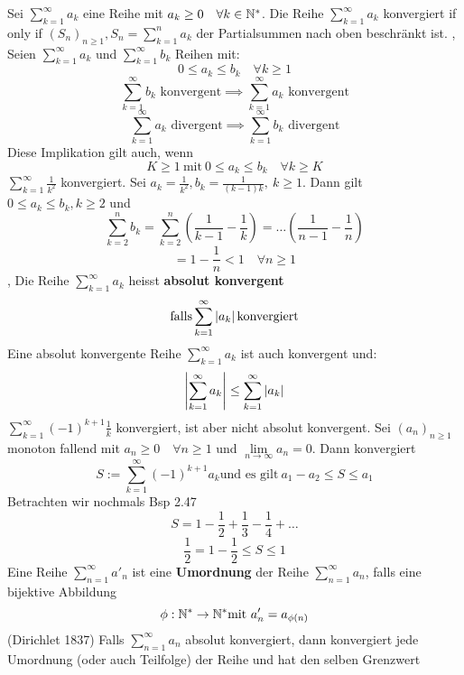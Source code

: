 \Satz[2.42] Sei \(\sum_{k=1}^{\infty} a_{k}\) eine Reihe mit \newline \(a_k \geq 0 \quad \forall k \in \mathbb{N}^*\). Die Reihe \(\sum_{k=1}^{\infty} a_{k}\) konvergiert if only if \((S_n)_{n \geq 1}, S_n = \sum_{k=1}^{n} a_{k}\) der Partialsummen nach oben beschränkt ist. \newline
\sep
{} \newline Seien $\sum_{k=1}^{\infty} a_{k}$ und $\sum_{k=1}^{\infty} b_{k}$ Reihen mit: \[0 \leq a_{k} \leq b_{k} \quad \forall k \geq 1\]
\[ \sum_{k=1}^{\infty} b_{k} \text{ konvergent} \implies \sum_{k=1}^{\infty} a_{k} \text{ konvergent} \]
\[ \sum_{k=1}^{\infty} a_{k} \text{ divergent} \implies \sum_{k=1}^{\infty} b_{k} \text{ divergent} \]
Diese Implikation gilt auch, wenn \[K \geq 1 \  \text{mit} \ 0 \leq a_k \leq b_k \quad \forall k \geq K\]
\Bsp[2.44] \( \sum_{k=1}^\infty \frac{1}{k^2}\) konvergiert. \newline
Sei \( a_k = \frac{1}{k^2}, b_k = \frac{1}{(k-1)k},\  k \geq 1\). Dann gilt \( 0 \leq a_k \leq b_k, k \geq 2\) und
\[ \sum_{k=2}^{n}b_k = \sum_{k=2}^n\left( \frac{1}{k-1}- \frac{1}{k}\right) = \dots \left(\frac{1}{n-1} - \frac{1}{n}\right)\]
\[ = 1 - \frac{1}{n} < 1 \quad \forall n \geq 1\]
\sep
\Def[2.45] Die Reihe \(\sum_{k=1}^{\infty} a_{k}\) heisst \textbf{absolut konvergent}
\[\text{falls} \sum_{k=1}^{\infty} \left\lvert a_{k} \right\rvert \text{konvergiert}\] \newline
\Satz[2.46] Eine absolut konvergente Reihe  \(\sum_{k=1}^{\infty} a_{k}\) ist auch konvergent und:
\[\left\lvert \sum_{k=1}^{\infty} a_{k} \right\rvert \leq \sum_{k=1}^{\infty} \left\lvert a_{k} \right\rvert\] \newline
\Bsp[2.47] \( \sum_{k=1}^\infty(-1)^{k+1} \frac{1}{k} \) konvergiert, ist aber nicht absolut konvergent.
\Satz[2.48 (Leibniz 1682)] Sei \((a_n)_{n \geq 1}\) monoton fallend mit \(a_n \geq 0 \quad \forall n \geq 1\) und \(\lim\limits_{n \rightarrow \infty} a_n = 0\). Dann konvergiert
\[S := \sum_{k=1}^{\infty} (-1)^{k+1}a_k \text{und es gilt} \  a_1 - a_2 \leq S \leq a_1\]
\Bsp[2.49] Betrachten wir nochmals Bsp 2.47
\[ S = 1 - \frac{1}{2} + \frac{1}{3} - \frac{1}{4} + \dots\]
\[ \frac{1}{2} = 1 - \frac{1}{2} \leq S \leq 1\]
\Def[2.50] Eine Reihe \(\sum_{n=1}^{\infty} a'_n\) ist eine \textbf{Umordnung} der Reihe \(\sum_{n=1}^{\infty} a_n\), falls eine bijektive Abbildung
\[\phi : \mathbb{N}^{*} \rightarrow \mathbb{N}^{*} \text{mit} \ a'_{n} = a_{\phi(n)}\] \newline
\Satz[2.52](Dirichlet 1837) Falls \(\sum_{n=1}^{\infty} a_n\) absolut konvergiert, dann konvergiert jede Umordnung (oder auch Teilfolge) der Reihe und hat den selben Grenzwert
